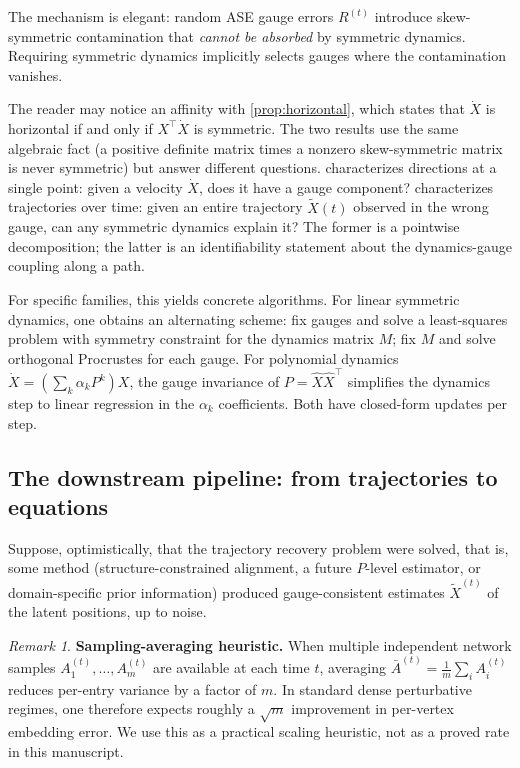 \documentclass{article}
\theoremstyle{plain}
\theoremstyle{definition}
\theoremstyle{remark}
\newtheorem*{remark}{Remark}
\begin{document}
The mechanism is elegant: random ASE gauge errors $R^{(t)}$ introduce skew-symmetric contamination that \emph{cannot be absorbed} by symmetric dynamics.
Requiring symmetric dynamics implicitly selects gauges where the contamination vanishes.

The reader may notice an affinity with \cref{prop:horizontal}, which states that $\dot{X}$ is horizontal if and only if $X^\top \dot{X}$ is symmetric.
The two results use the same algebraic fact (a positive definite matrix times a nonzero skew-symmetric matrix is never symmetric) but answer different questions.
 characterizes directions at a single point: given a velocity $\dot{X}$, does it have a gauge component?
 characterizes trajectories over time: given an entire trajectory $\tilde{X}(t)$ observed in the wrong gauge, can any symmetric dynamics explain it?
The former is a pointwise decomposition; the latter is an identifiability statement about the dynamics-gauge coupling along a path.

For specific families, this yields concrete algorithms.
For linear symmetric dynamics, one obtains an alternating scheme: fix gauges and solve a least-squares problem with symmetry constraint for the dynamics matrix $M$; fix $M$ and solve orthogonal Procrustes for each gauge.
For polynomial dynamics $\dot{X} = (\sum_k \alpha_k P^k) X$, the gauge invariance of $P = \hat{X} \hat{X}^\top$ simplifies the dynamics step to linear regression in the $\alpha_k$ coefficients.
Both have closed-form updates per step.


\subsection{The downstream pipeline: from trajectories to equations}

Suppose, optimistically, that the trajectory recovery problem were solved, that is, some method (structure-constrained alignment, a future $P$-level estimator, or domain-specific prior information) produced gauge-consistent estimates $\tilde{X}^{(t)}$ of the latent positions, up to noise.

\begin{remark}
\textbf{Sampling-averaging heuristic.}
When multiple independent network samples $A_1^{(t)}, \ldots, A_m^{(t)}$ are available at each time $t$, averaging
$\bar{A}^{(t)} = \frac{1}{m} \sum_i A_i^{(t)}$
reduces per-entry variance by a factor of $m$.
In standard dense perturbative regimes, one therefore expects roughly a $\sqrt{m}$ improvement in per-vertex embedding error.
We use this as a practical scaling heuristic, not as a proved rate in this manuscript.
\end{remark}
\end{document}
